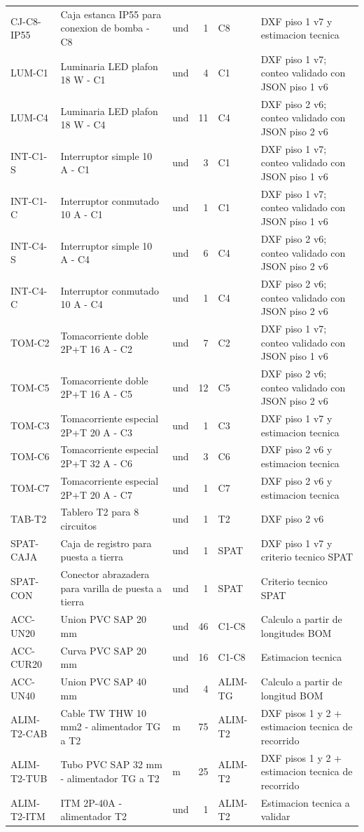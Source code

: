 \begin{longtable}{p{1.5cm}p{5.5cm}p{0.8cm}r p{1.2cm}p{4.0cm}}
CJ-C8-IP55 & Caja estanca IP55 para conexion de bomba - C8 & und & 1 & C8 & DXF piso 1 v7 y estimacion tecnica \\
LUM-C1 & Luminaria LED plafon 18 W - C1 & und & 4 & C1 & DXF piso 1 v7; conteo validado con JSON piso 1 v6 \\
LUM-C4 & Luminaria LED plafon 18 W - C4 & und & 11 & C4 & DXF piso 2 v6; conteo validado con JSON piso 2 v6 \\
INT-C1-S & Interruptor simple 10 A - C1 & und & 3 & C1 & DXF piso 1 v7; conteo validado con JSON piso 1 v6 \\
INT-C1-C & Interruptor conmutado 10 A - C1 & und & 1 & C1 & DXF piso 1 v7; conteo validado con JSON piso 1 v6 \\
INT-C4-S & Interruptor simple 10 A - C4 & und & 6 & C4 & DXF piso 2 v6; conteo validado con JSON piso 2 v6 \\
INT-C4-C & Interruptor conmutado 10 A - C4 & und & 1 & C4 & DXF piso 2 v6; conteo validado con JSON piso 2 v6 \\
TOM-C2 & Tomacorriente doble 2P+T 16 A - C2 & und & 7 & C2 & DXF piso 1 v7; conteo validado con JSON piso 1 v6 \\
TOM-C5 & Tomacorriente doble 2P+T 16 A - C5 & und & 12 & C5 & DXF piso 2 v6; conteo validado con JSON piso 2 v6 \\
TOM-C3 & Tomacorriente especial 2P+T 20 A - C3 & und & 1 & C3 & DXF piso 1 v7 y estimacion tecnica \\
TOM-C6 & Tomacorriente especial 2P+T 32 A - C6 & und & 3 & C6 & DXF piso 2 v6 y estimacion tecnica \\
TOM-C7 & Tomacorriente especial 2P+T 20 A - C7 & und & 1 & C7 & DXF piso 2 v6 y estimacion tecnica \\
TAB-T2 & Tablero T2 para 8 circuitos & und & 1 & T2 & DXF piso 2 v6 \\
SPAT-CAJA & Caja de registro para puesta a tierra & und & 1 & SPAT & DXF piso 1 v7 y criterio tecnico SPAT \\
SPAT-CON & Conector abrazadera para varilla de puesta a tierra & und & 1 & SPAT & Criterio tecnico SPAT \\
ACC-UN20 & Union PVC SAP 20 mm & und & 46 & C1-C8 & Calculo a partir de longitudes BOM \\
ACC-CUR20 & Curva PVC SAP 20 mm & und & 16 & C1-C8 & Estimacion tecnica \\
ACC-UN40 & Union PVC SAP 40 mm & und & 4 & ALIM-TG & Calculo a partir de longitud BOM \\
ALIM-T2-CAB & Cable TW THW 10 mm2 - alimentador TG a T2 & m & 75 & ALIM-T2 & DXF pisos 1 y 2 + estimacion tecnica de recorrido \\
ALIM-T2-TUB & Tubo PVC SAP 32 mm - alimentador TG a T2 & m & 25 & ALIM-T2 & DXF pisos 1 y 2 + estimacion tecnica de recorrido \\
ALIM-T2-ITM & ITM 2P-40A - alimentador T2 & und & 1 & ALIM-T2 & Estimacion tecnica a validar \\
\bottomrule\end{longtable}
\normalsize
